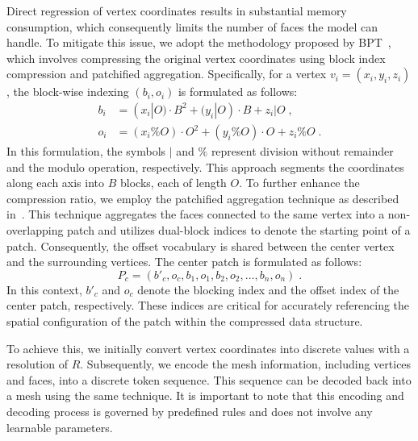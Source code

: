Direct regression of vertex coordinates results in substantial memory consumption, which consequently limits the number of faces the model can handle. To mitigate this issue, we adopt the methodology proposed by BPT~\cite{weng2024scaling}, which involves compressing the original vertex coordinates using block index compression and patchified aggregation. Specifically, for a vertex $v_{i} = (x_i,y_i,z_i)$, the block-wise indexing $(b_i,o_i)$ is formulated as follows:
\begin{equation}\label{eq:bpt1}
\begin{split}
    b_{i} &= (x_i|O)\cdot B^{2} + (y_{i}| O)\cdot B + z_{i}|O\;, \\
    o_{i} &= (x_{i}\%O) \cdot O^{2} + (y_{i}\%O)\cdot O + z_{i}\%O\;.
\end{split}
\end{equation}
In this formulation, the symbols $|$ and $\%$ represent division without remainder and the modulo operation, respectively. This approach segments the coordinates along each axis into $B$ blocks, each of length $O$. To further enhance the compression ratio, we employ the patchified aggregation technique as described in~\cite{weng2024scaling}. This technique aggregates the faces connected to the same vertex into a non-overlapping patch and utilizes dual-block indices to denote the starting point of a patch. Consequently, the offset vocabulary is shared between the center vertex and the surrounding vertices. The center patch is formulated as follows:
\begin{equation}\label{eq:bpt2}
P_{c} = (b'_{c},o_{c},b_{1},o_{1},b_{2},o_{2},\dots,b_{n},o_{n})\;.
\end{equation}
In this context, $b'_{c}$ and $o_{c}$ denote the blocking index and the offset index of the center patch, respectively. These indices are critical for accurately referencing the spatial configuration of the patch within the compressed data structure.

To achieve this, we initially convert vertex coordinates into discrete values with a resolution of $R$. Subsequently, we encode the mesh information, including vertices and faces, into a discrete token sequence. This sequence can be decoded back into a mesh using the same technique. It is important to note that this encoding and decoding process is governed by predefined rules and does not involve any learnable parameters.

